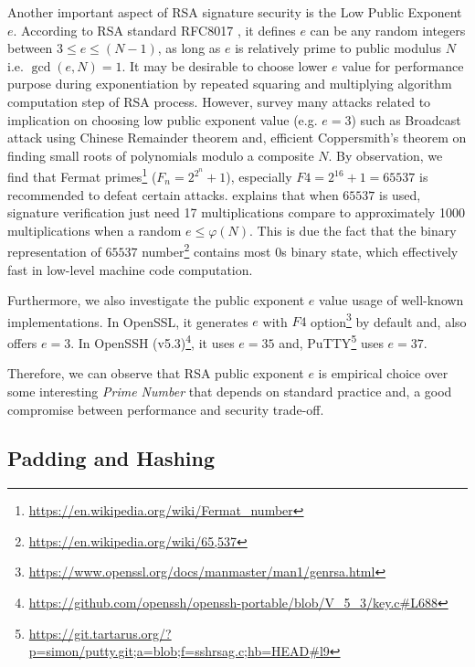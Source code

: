 \documentclass[10pt,sigconf]{acmart}
\begin{document}
Another important aspect of RSA signature security is the Low Public Exponent $e$. According to RSA standard RFC8017 \cite{rfc8017}, it defines $e$ can be any random integers between $3 \leq e \leq (N - 1)$, as long as $e$ is relatively prime to public modulus $N$ i.e. $\gcd(e, N) = 1$. It may be desirable to choose lower $e$ value for performance purpose during exponentiation by repeated squaring and multiplying algorithm computation step of RSA process. However, \cite{boneh1999twenty} survey many attacks related to implication on choosing low public exponent value (e.g. $e=3$) such as Broadcast attack using Chinese Remainder theorem and, efficient Coppersmith's \cite{coppersmith1997small} theorem on finding small roots of polynomials modulo a composite $N$. By observation, we find that Fermat primes\footnote{\url{https://en.wikipedia.org/wiki/Fermat\_number}} ($F_n = 2^{2^n} + 1$), especially $F4 = 2^{16}+ 1 = 65537$ is recommended to defeat certain attacks. \cite{boneh1999twenty} explains that when $65537$ is used, signature verification just need 17 multiplications compare to approximately 1000 multiplications when a random $e \leq \varphi(N)$. This is due the fact that the binary representation of $65537$ number\footnote{\url{https://en.wikipedia.org/wiki/65,537}} contains most $0$s binary state, which effectively fast in low-level machine code computation.

Furthermore, we also investigate the public exponent $e$ value usage of well-known implementations. In OpenSSL, it generates $e$ with $F4$ option\footnote{\url{https://www.openssl.org/docs/manmaster/man1/genrsa.html}} by default and, also offers $e=3$. In OpenSSH (v5.3)\footnote{\url{https://github.com/openssh/openssh-portable/blob/V_5_3/key.c\#L688}}, it uses $e = 35$ and,  PuTTY\footnote{\url{https://git.tartarus.org/?p=simon/putty.git;a=blob;f=sshrsag.c;hb=HEAD\#l9}} uses $e = 37$.

Therefore, we can observe that RSA public exponent $e$ is empirical choice over some interesting \textit{Prime Number} that depends on standard practice and, a good compromise between performance and security trade-off.

\subsection{Padding and Hashing}
\end{document}
